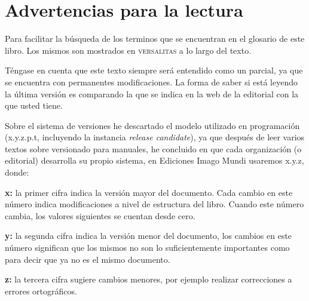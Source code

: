 \documentclass{book}
\begin{document}
\tableofcontents

\chapter{Advertencias para la lectura}
{
\begin{compactitem}
\item Para facilitar la búsqueda de los terminos que se encuentran en el glosario de este libro. Los mismos son mostrados en \textsc{versalitas} a lo largo del texto.

\item Téngase en cuenta que este texto siempre será entendido como un parcial, ya que se encuentra con permanentes modificaciones. La forma de saber si está leyendo la última versión es comparando la que se indica en la web de la editorial con la que usted tiene.

Sobre el sistema de versiones he descartado el modelo utilizado en programación (x.y.z.p.t, incluyendo la instancia \emph{release candidate}), ya que después de leer varios textos sobre versionado para manuales, he concluido en que cada organización (o editorial) desarrolla su propio sistema, en Ediciones Imago Mundi usaremos x.y.z, donde:

\begin{compactdesc}
\item [\textbf{x:}] la primer cifra indica la versión mayor del documento. Cada cambio en este número indica modificaciones a nivel de estructura del libro. Cuando este número cambia, los valores siguientes se cuentan desde cero.
\item [\textbf{y:}] la segunda cifra indica la versión menor del documento, los cambios en este número significan que los mismos no son lo suficientemente importantes como para decir que ya no es el mismo documento.
\item [\textbf{z:}] la tercera cifra sugiere cambios menores, por ejemplo realizar correcciones a errores ortográficos.
\end{compactdesc}
\end{compactitem}

}
\end{document}
